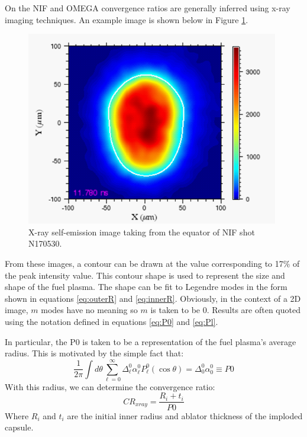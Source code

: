 On the NIF and OMEGA convergence ratios are generally inferred using x-ray imaging techniques. An example image is shown below in Figure \ref{fig:xrayImage}. 

\begin{figure}[h!]
    \centering
    \includegraphics[scale=2.0]{Figures/xrayImage.pdf}
    \caption[Example X-ray Image]{ X-ray self-emission image taking from the equator of NIF shot N170530. }
    \label{fig:xrayImage}
\end{figure}

From these images, a contour can be drawn at the value corresponding to 17\% of the peak intensity value. This contour shape is used to represent the size and shape of the fuel plasma. The shape can be fit to Legendre modes in the form shown in equations \ref{eq:outerR} and \ref{eq:innerR}. Obviously, in the context of a 2D image, $m$ modes have no meaning so $m$ is taken to be 0. Results are often quoted using the notation defined in equations \ref{eq:P0} and \ref{eq:Pl}.

In particular, the P0 is taken to be a representation of the fuel plasma's average radius. This is motivated by the simple fact that:
%
\begin{equation}
    \frac{1}{2\pi} \int d\theta \sum_{\ell=0}^{\infty} \Delta_\ell^0 \alpha_\ell^0 P_\ell^0(\cos\theta) = \Delta_0^0\alpha_0^0 \equiv P0
\end{equation}
%
With this radius, we can determine the convergence ratio:
%
\begin{equation}
    CR_{xray} = \frac{R_i + t_i}{P0}
\end{equation}
%
Where $R_i$ and $t_i$ are the initial inner radius and ablator thickness of the imploded capsule. 

